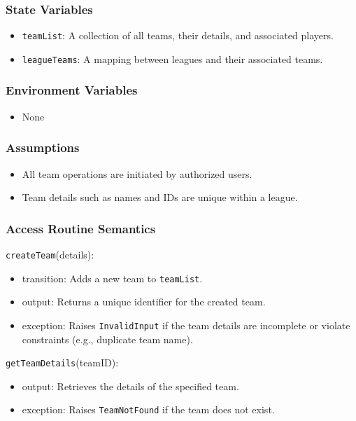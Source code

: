 \documentclass[12pt, titlepage]{article}
\begin{document}
\subsubsection{State Variables}
\begin{itemize}
    \item \texttt{teamList}: A collection of all teams, their details, and associated players.
    \item \texttt{leagueTeams}: A mapping between leagues and their associated teams.
\end{itemize}

\subsubsection{Environment Variables}
\begin{itemize}
    \item None
\end{itemize}

\subsubsection{Assumptions}
\begin{itemize}
    \item All team operations are initiated by authorized users.
    \item Team details such as names and IDs are unique within a league.
\end{itemize}

\subsubsection{Access Routine Semantics}

\noindent \texttt{createTeam}(details):  
\begin{itemize}
    \item transition: Adds a new team to \texttt{teamList}.
    \item output: Returns a unique identifier for the created team.
    \item exception: Raises \texttt{InvalidInput} if the team details are incomplete or violate constraints (e.g., duplicate team name).
\end{itemize}

\noindent \texttt{getTeamDetails}(teamID):  
\begin{itemize}
    \item output: Retrieves the details of the specified team.
    \item exception: Raises \texttt{TeamNotFound} if the team does not exist.
\end{itemize}
\end{document}
